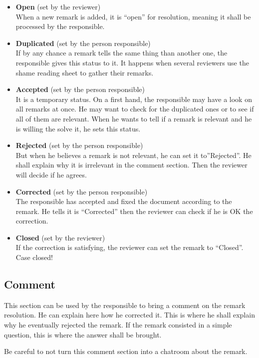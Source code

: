 \begin{itemize}
    \item \textbf{Open} (set by the reviewer)\\When a new remark is added, it is “open” for resolution, meaning it shall be processed by the responsible.
    \item \textbf{Duplicated} (set by the person responsible)\\If by any chance a remark tells the same thing than another one, the responsible gives this status to it. It happens when several reviewers use the shame reading sheet to gather their remarks.
    \item \textbf{Accepted} (set by the person responsible)\\It is a temporary status. On a first hand, the responsible may have a look on all remarks at once. He may want to check for the duplicated ones or to see if all of them are relevant. When he wants to tell if a remark is relevant and he is willing the solve it, he sets this status.
    \item \textbf{Rejected} (set by the person responsible)\\But when he believes a remark is not relevant, he can set it to”Rejected”. He shall explain why it is irrelevant in the comment section. Then the reviewer will decide if he agrees.
    \item \textbf{Corrected} (set by the person responsible)\\The responsible has accepted and fixed the document according to the remark. He tells it is “Corrected” then the reviewer can check if he is OK the correction.
    \item \textbf{Closed} (set by the reviewer)\\If the correction is satisfying, the reviewer can set the remark to “Closed”. Case closed!
\end{itemize}

\subsection{Comment}
This section can be used by the responsible to bring a comment on the remark resolution. He can explain here how he corrected it.
This is where he shall explain why he eventually rejected the remark.
If the remark consisted in a simple question, this is where the answer shall be brought.

Be careful to not turn this comment section into a chatroom about the remark.


